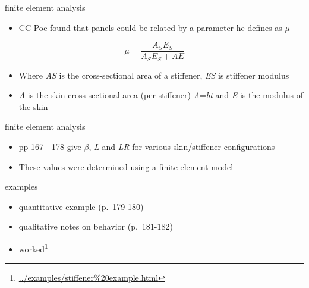 \documentclass[
  letterpaper,
  ignorenonframetext,
  aspectratio=43,
  handout,
  12pt]{beamer}
\DeclareRobustCommand{\href}[2]{#2\footnote{\url{#1}}}
\providecommand{\tightlist}{%
  \setlength{\itemsep}{0pt}\setlength{\parskip}{0pt}}
\providecommand{\tightlist}{%
\setlength{\itemsep}{0pt}\setlength{\parskip}{0pt}}
\begin{document}
\begin{frame}{finite element analysis}
\protect\hypertarget{finite-element-analysis}{}
\begin{itemize}
\tightlist
\item
  CC Poe found that panels could be related by a parameter he defines as
  \(\mu\)
\end{itemize}

\[\mu = \frac{A_S E_S}{A_S E_S + A E}\]

\begin{itemize}
\tightlist
\item
  Where \emph{A}\emph{S} is the cross-sectional area of a stiffener,
  \emph{E}\emph{S} is stiffener modulus
\item
  \emph{A} is the skin cross-sectional area (per stiffener)
  \emph{A}=\emph{bt} and \emph{E} is the modulus of the skin
\end{itemize}
\end{frame}

\begin{frame}{finite element analysis}
\protect\hypertarget{finite-element-analysis-1}{}
\begin{itemize}
\tightlist
\item
  pp 167 - 178 give \(\beta\), \emph{L} and \emph{L}\emph{R} for various
  skin/stiffener configurations
\item
  These values were determined using a finite element model
\end{itemize}
\end{frame}

\begin{frame}{examples}
\protect\hypertarget{examples}{}
\begin{itemize}
\tightlist
\item
  quantitative example (p.~179-180)
\item
  qualitative notes on behavior (p.~181-182)
\item
  \href{../examples/stiffener\%20example.html}{worked}
\end{itemize}
\end{frame}
\end{document}
